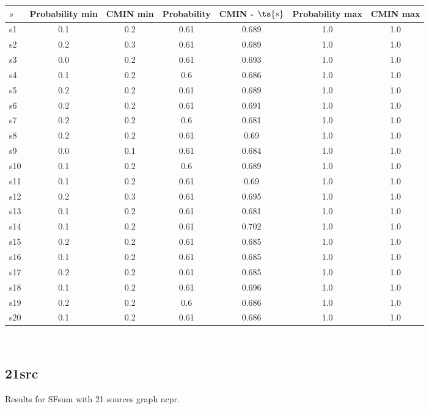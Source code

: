 \documentclass{article}
\begin{document}
\noindent\begin{tabular}{|l|c|c|c|c|c|c|}
\hline
$s$& Probability min & CMIN min & Probability & CMIN - $\ts{s}$ & Probability max & CMIN max\\
\hline
s1 &0.1 & 0.2 & 0.61 & 0.689 & 1.0 & 1.0\\
\hline
s2 &0.2 & 0.3 & 0.61 & 0.689 & 1.0 & 1.0\\
\hline
s3 &0.0 & 0.2 & 0.61 & 0.693 & 1.0 & 1.0\\
\hline
s4 &0.1 & 0.2 & 0.6 & 0.686 & 1.0 & 1.0\\
\hline
s5 &0.2 & 0.2 & 0.61 & 0.689 & 1.0 & 1.0\\
\hline
s6 &0.2 & 0.2 & 0.61 & 0.691 & 1.0 & 1.0\\
\hline
s7 &0.2 & 0.2 & 0.6 & 0.681 & 1.0 & 1.0\\
\hline
s8 &0.2 & 0.2 & 0.61 & 0.69 & 1.0 & 1.0\\
\hline
s9 &0.0 & 0.1 & 0.61 & 0.684 & 1.0 & 1.0\\
\hline
s10 &0.1 & 0.2 & 0.6 & 0.689 & 1.0 & 1.0\\
\hline
s11 &0.1 & 0.2 & 0.61 & 0.69 & 1.0 & 1.0\\
\hline
s12 &0.2 & 0.3 & 0.61 & 0.695 & 1.0 & 1.0\\
\hline
s13 &0.1 & 0.2 & 0.61 & 0.681 & 1.0 & 1.0\\
\hline
s14 &0.1 & 0.2 & 0.61 & 0.702 & 1.0 & 1.0\\
\hline
s15 &0.2 & 0.2 & 0.61 & 0.685 & 1.0 & 1.0\\
\hline
s16 &0.1 & 0.2 & 0.61 & 0.685 & 1.0 & 1.0\\
\hline
s17 &0.2 & 0.2 & 0.61 & 0.685 & 1.0 & 1.0\\
\hline
s18 &0.1 & 0.2 & 0.61 & 0.696 & 1.0 & 1.0\\
\hline
s19 &0.2 & 0.2 & 0.6 & 0.686 & 1.0 & 1.0\\
\hline
s20 &0.1 & 0.2 & 0.61 & 0.686 & 1.0 & 1.0\\
\hline
\end{tabular}\\

\newpage

\subsection{21src}

\noindent Results for SFsum with 21 sources graph ncpr.
\end{document}
